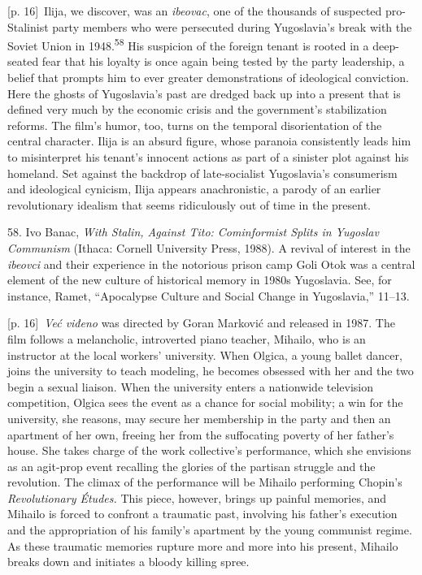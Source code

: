 \documentclass[10pt,a4paper]{article}
\begin{document}
{\scriptsize\color{gray} [p. 16]}\ Ilija, we discover, was an \textit{ibeovac}, one of the thousands of suspected pro-Stalinist party members who were persecuted during Yugoslavia’s break with the Soviet Union in 1948.\nobreak\textsuperscript{58} His suspicion of the foreign tenant is rooted in a deep-seated fear that his loyalty is once again being tested by the party leadership, a belief that prompts him to ever greater demonstrations of ideological conviction. Here the ghosts of Yugoslavia’s past are dredged back up into a present that is defined very much by the economic crisis and the government’s stabilization reforms. The film’s humor, too, turns on the temporal disorientation of the central character. Ilija is an absurd figure, whose paranoia consistently leads him to misinterpret his tenant’s innocent actions as part of a sinister plot against his homeland. Set against the backdrop of late-socialist Yugoslavia’s consumerism and ideological cynicism, Ilija appears anachronistic, a parody of an earlier revolutionary idealism that seems ridiculously out of time in the present.\par{\small 58. Ivo Banac, \textit{With Stalin, Against Tito: Cominformist Splits in Yugoslav Communism} (Ithaca: Cornell University Press, 1988). A revival of interest in the \textit{ibeovci} and their experience in the notorious prison camp Goli Otok was a central element of the new culture of historical memory in 1980s Yugoslavia. See, for instance, Ramet, “Apocalypse Culture and Social Change in Yugoslavia,” 11–13.\par}
{\scriptsize\color{gray} [p. 16]}\ \textit{Već viđeno} was directed by Goran Marković and released in 1987. The film follows a melancholic, introverted piano teacher, Mihailo, who is an instructor at the local workers’ university. When Olgica, a young ballet dancer, joins the university to teach modeling, he becomes obsessed with her and the two begin a sexual liaison. When the university enters a nationwide television competition, Olgica sees the event as a chance for social mobility; a win for the university, she reasons, may secure her membership in the party and then an apartment of her own, freeing her from the suffocating poverty of her father’s house. She takes charge of the work collective’s performance, which she envisions as an agit-prop event recalling the glories of the partisan struggle and the revolution. The climax of the performance will be Mihailo performing Chopin’s \textit{Revolutionary Études.} This piece, however, brings up painful memories, and Mihailo is forced to confront a traumatic past, involving his father’s execution and the appropriation of his family’s apartment by the young communist regime. As these traumatic memories rupture more and more into his present, Mihailo breaks down and initiates a bloody killing spree.\par
\end{document}
